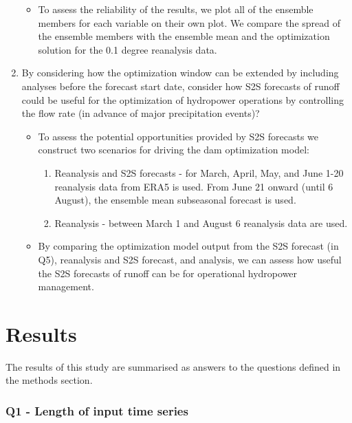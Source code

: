 \documentclass[11pt]{article}
\begin{document}
\begin{enumerate}
\begin{itemize}
            \item To assess the reliability of the results, we plot all of the ensemble members for each variable on their own plot. We compare the spread of the ensemble members with the ensemble mean and the optimization solution for the 0.1 degree reanalysis data.
        \end{itemize}
    \item By considering how the optimization window can be extended by including analyses before the forecast start date, consider how S2S forecasts of runoff could be useful for the optimization of hydropower operations by controlling the flow rate (in advance of major precipitation events)?
        \begin{itemize}
            \item To assess the potential opportunities provided by S2S forecasts we construct two scenarios for driving the dam optimization model:
                \begin{enumerate}
                    \item Reanalysis and S2S forecasts - for March, April, May, and June 1-20 reanalysis data from ERA5 is used. From June 21 onward (until 6 August), the ensemble mean subseasonal forecast is used. 
                    \item Reanalysis - between March 1 and August 6 reanalysis data are used.
                \end{enumerate}
            \item By comparing the optimization model output from the S2S forecast (in Q5), reanalysis and S2S forecast, and analysis, we can assess how useful the S2S forecasts of runoff can be for operational hydropower management.
        \end{itemize}
\end{enumerate}

\section*{Results}

The results of this study are summarised as answers to the questions defined in the methods section.

\subsubsection*{Q1 - Length of input time series}
\end{document}
